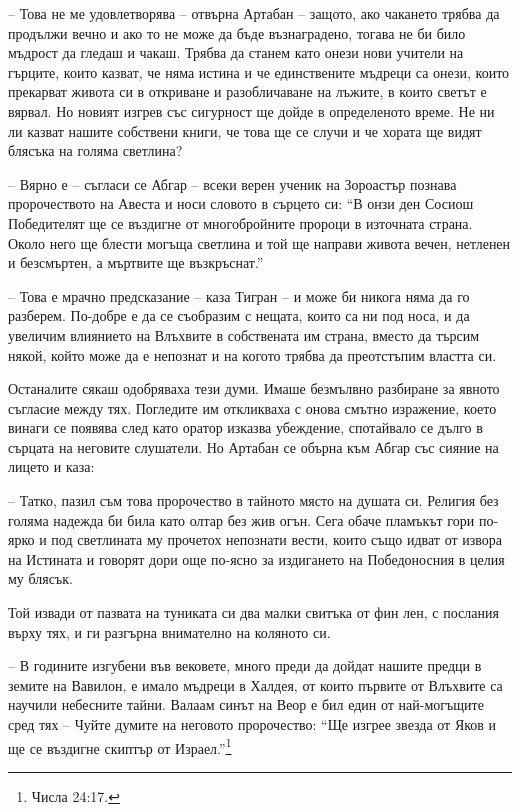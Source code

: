 -- Това не ме удовлетворява -- отвърна Артабан -- защото, ако чакането трябва да
продължи вечно и ако то не може да бъде възнаградено, тогава не би било мъдрост
да гледаш и чакаш. Трябва да станем като онези нови учители на гърците, които
казват, че няма истина и че единствените мъдреци са онези, които прекарват
живота си в откриване и разобличаване на лъжите, в които светът е вярвал. Но
новият изгрев със сигурност ще дойде в определеното време. Не ни ли казват
нашите собствени книги, че това ще се случи и че хората ще видят блясъка на
голяма светлина?

-- Вярно е -- съгласи се Абгар -- всеки верен ученик на Зороастър познава
пророчеството на Авеста и носи словото в сърцето си: ``В онзи ден Сосиош
Победителят ще се въздигне от многобройните пророци в източната страна. Около
него ще блести могъща светлина и той ще направи живота вечен, нетленен и
безсмъртен, а мъртвите ще възкръснат.''

-- Това е мрачно предсказание -- каза Тигран -- и може би никога няма да го
разберем. По-добре е да се съобразим с нещата, които са ни под носа, и да
увеличим влиянието на Влъхвите в собствената им страна, вместо да търсим някой,
който може да е непознат и на когото трябва да преотстъпим властта си.

Останалите сякаш одобряваха тези думи. Имаше безмълвно разбиране за явното
съгласие между тях. Погледите им откликваха с онова смътно изражение, което
винаги се появява след като оратор изказва убеждение, спотайвало се дълго в
сърцата на неговите слушатели. Но Артабан се обърна към Абгар със сияние на
лицето и каза:

-- Татко, пазил съм това пророчество в тайното място на душата си. Религия без
голяма надежда би била като олтар без жив огън. Сега обаче пламъкът гори по-ярко
и под светлината му прочетох непознати вести, които също идват от извора на
Истината и говорят дори още по-ясно за издигането на Победоносния в целия му
блясък.

Той извади от пазвата на туниката си два малки свитъка от фин лен, с послания
върху тях, и ги разгърна внимателно на коляното си.

-- В годините изгубени във вековете, много преди да дойдат нашите предци в
земите на Вавилон, е имало мъдреци в Халдея, от които първите от Влъхвите са
научили небесните тайни. Валаам синът на Веор е бил един от най-могъщите сред
тях -- Чуйте думите на неговото пророчество: ``Ще изгрее звезда от Яков и ще се
въздигне скиптър от Израел.''\footnote{Числа 24:17.}

